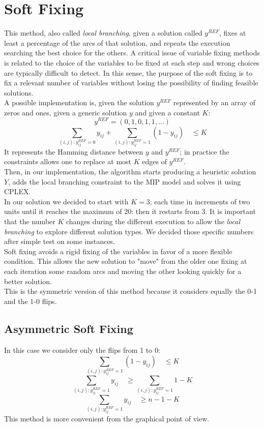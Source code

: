\section{Soft Fixing}
This method, also called \textit{local branching}, given a solution called $y^{REF}$, fixes at least a percentage of the arcs of that solution, and repeats the execution searching the best choice for the others. A critical issue of variable fixing methods is related to the choice of the variables to be fixed at each step and wrong choices are typically difficult to detect. In this sense, the purpose of the soft fixing is to fix a relevant number of variables without losing the possibility of finding feasible solutions.\\
A possible implementation is, given the solution $y^{REF}$ represented by an array of zeros and ones, given a generic solution $y$ and given a constant $K$:
\[
	y^{REF} = (0,1,0,1,1,...)
\]
\[
	\sum_{(i,j):y^{REF}_{ij}=0} y_{ij} + \sum_{(i,j):y^{REF}_{ij}=1} (1-y_{ij}) \quad \leq K
\]
It represents the Hamming distance between $y$ and $y^{REF}$; in practice the constraints allows one to replace at most $K$ edges of $y^{REF}$. \\
Then, in our implementation, the algorithm starts producing a heuristic solution $Y$, adds the local branching constraint to the MIP model and solves it using \textsc{CPLEX}.\\
In our solution we decided to start with $K=3$; each time in increments of two units until it reaches the maximum of 20: then it restarts from 3. It is important that the number $K$ changes during the different execution to allow the \textit{local branching} to explore different solution types. We decided those specific numbers after simple test on some instances.\\
Soft fixing avoids a rigid fixing of the variables in favor of a more flexible condition. This allows the new solution to "move" from the older one fixing at each iteration some random arcs and moving the other looking quickly for a better solution.\\
This is the symmetric version of this method because it considers equally the 0-1 and the 1-0 flips. 
\subsection{Asymmetric Soft Fixing}
In this case we consider only the flips from 1 to 0:
\[
	\sum_{(i,j):y^{REF}_{ij}=1} (1-y_{ij}) \quad \leq K
\]
\[
	\sum_{(i,j):y^{REF}_{ij}=1} y_{ij} \quad \geq \sum_{(i,j):y^{REF}_{ij}=1} 1 - K
\]
\[
	\sum_{(i,j):y^{REF}_{ij}=1} y_{ij} \quad \geq n - 1 - K
\]
This method is more convenient from the graphical point of view. 
